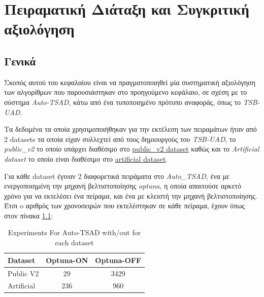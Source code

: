 
\chapter{Πειραματική Διάταξη και Συγκριτική αξιολόγηση} %

\label{Chapter3} %




\section{Γενικά}

Σκοπός αυτού του κεφαλαίου είναι να πραγματοποιηθεί μία συστηματική αξιολόγηση των αλγορίθμων που παρουσιάστηκαν στο προηγούμενο κεφάλαιο, σε σχέση με το σύστημα \emph{Auto-TSAD}, κάτω από ένα τυποποιημένο πρότυπο αναφοράς, όπως το \emph{TSB-UAD}.

Τα δεδομένα τα οποία χρησιμοποιήθηκαν για την εκτέλεση των πειραμάτων ήταν από 2 datasets τα οποία είχαν συλλεχτεί από τους δημιουργούς του \emph{TSB-UAD}, το \emph{public\_v2} το οποίο υπάρχει διαθέσιμο στο \href{https://www.thedatum.org/datasets/TSB-UAD-Public-v2.zip}{public\_v2 dataset} καθώς και το \emph{Artificial dataset} το οποίο είναι διαθέσιμο στο \href{https://www.thedatum.org/datasets/TSB-UAD-Artificial.zip}{artificial dataset}. 

Για κάθε dataset έγιναν 2 διαφορετικά πειράματα στο \emph{Auto\_TSAD}, ένα με ενεργοποιημένη την μηχανή βελτιστοποίησης \emph{optuna}, η οποία απαιτούσε αρκετό χρόνο για να εκτελέσει ένα πείραμα, και ένα με κλειστή την μηχανή βελτιστοποίησης. Έτσι o αριθμός των χρονοσειρών που εκτελέστηκαν σε κάθε πείραμα, έχουν όπως στον πίνακα \ref{tab:experiments_num}:

\begin{table}[h]
\centering
\caption{Experiments For Auto-TSAD with/out for each dataset}
\label{tab:experiments_num}
\begin{tabular}{lcc}
\toprule
Dataset & Optuna-ON & Optuna-OFF \\
\midrule
Public V2 & 29 & 3429 \\
Artificial & 236 & 960 \\
\bottomrule
\end{tabular}
\end{table}
